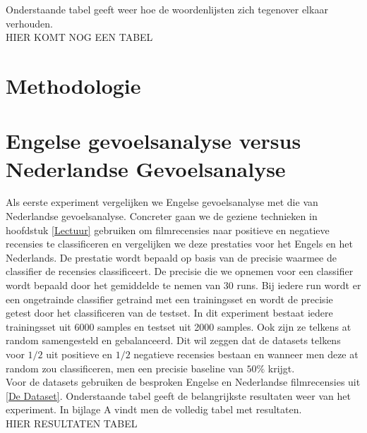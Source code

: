 Onderstaande tabel geeft weer hoe de woordenlijsten zich tegenover elkaar verhouden.\\
HIER KOMT NOG EEN TABEL\\


\section{Methodologie}\label{Methodologie}
\section{Engelse gevoelsanalyse versus Nederlandse Gevoelsanalyse}\label{Engelse gevoelsanalyse versus Nederlandse Gevoelsanalyse}
Als eerste experiment vergelijken we Engelse gevoelsanalyse met die van Nederlandse gevoelsanalyse. Concreter gaan we de geziene technieken in  hoofdstuk \ref{Lectuur} gebruiken om filmrecensies naar positieve en negatieve recensies te classificeren en vergelijken we deze prestaties voor het Engels en het Nederlands. De prestatie wordt bepaald op basis van de precisie waarmee de classifier de recensies classificeert. De precisie die we opnemen voor een classifier wordt bepaald door het gemiddelde te nemen van 30 runs. Bij iedere run wordt er een ongetrainde classifier getraind met een trainingsset en wordt de precisie getest door het classificeren van de testset. In dit experiment bestaat iedere trainingsset uit 6000 samples en testset uit 2000 samples. Ook zijn ze telkens at random samengesteld en gebalanceerd. Dit wil zeggen dat de datasets telkens voor $1/2$ uit positieve en $1/2$ negatieve recensies bestaan en wanneer men deze at random zou classificeren, men een precisie baseline van $50\%$ krijgt.\\

Voor de datasets gebruiken de besproken Engelse en Nederlandse filmrecensies uit \ref{De Dataset}.  
Onderstaande tabel geeft de belangrijkste resultaten weer van het experiment. In bijlage A vindt men de volledig tabel met resultaten.\\

HIER RESULTATEN TABEL

